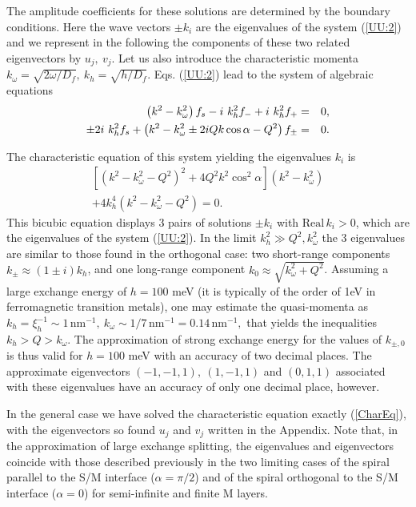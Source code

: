\documentclass[prb,amsmath,amssymb,reprint]{revtex4-2}
\begin{document}
The amplitude coefficients for these solutions are determined by the boundary
conditions. Here the wave vectors $ \pm k_{i}$ are the eigenvalues of the system (\ref{UU:2}) and we represent in the following the components of these two related eigenvectors by $u_{j},~v_{j}$. Let us also introduce the characteristic momenta $k_{\omega }= \sqrt{2\omega /D_{f}},~k_{h}=\sqrt{h/D_{f}}$.
Eqs. (\ref{UU:2}) lead to the system of algebraic equations
\begin{eqnarray}
\left( k^{2}-k_{\omega }^{2}\right) f_{s}-i\ k_{h}^{2}f_{-}+i\
k_{h}^{2}f_{+} &=&0,  \notag \\
 \pm 2i\ k_{h}^{2}f_{s}+\left( k^{2}-k_{\omega }^{2} \pm 2iQk\cos \alpha
-Q^{2}\right) f_{\pm} &=&0.  \label{kEq}
\end{eqnarray}

The characteristic equation of this system yielding the eigenvalues $k_{i}$ is
\begin{eqnarray}
\left[ (k^{2}-k_{\omega }^{2}-Q^{2})^{2}+4Q^{2}k^{2}\cos ^{2}\alpha \right]
\left( k^{2}-k_{\omega }^{2}\right) \nonumber \\ +4k_{h}^{4}(k^{2}-k_{\omega }^{2}-Q^{2})=0.
\label{CharEq}
\end{eqnarray}
This bicubic equation displays 3 pairs of solutions $\pm k_{i}$ with $\mathrm{Real} \, k_i>0$, which are the eigenvalues of the system (\ref{UU:2}). In the limit $k_{h}^{2}\gg Q^{2},k_{\omega }^{2}$ the 3 eigenvalues are similar to those found in the
orthogonal case: two short-range components $k_{\pm }\approx\left( 1\pm i\right) k_h$, and one long-range component $k_{0}\approx\sqrt{k_{\omega }^{2}+Q^{2}} $.
Assuming a large exchange energy of $h=100$ meV (it is typically of the order of 1eV in ferromagnetic transition metals),
 one may  estimate the
quasi-momenta  as \cite{Pugach2017} $k_{h}=\xi _{h}^{-1}\sim
1 \, $nm$^{-1},~k_{\omega }\sim 1/7 \, $nm$^{-1}=0.14 \,$nm$^{-1},$ that yields the inequalities $%
k_{h}>Q>k_{\omega }$. The approximation of strong exchange energy for the
values of $k_{\pm ,0}$ is thus valid for $h=100$ meV with an accuracy of two decimal places. The approximate eigenvectors $(-1,-1,1),~(1,-1,1)$ and $(0,1,1)$ associated with these eigenvalues have an accuracy of only one decimal place, however.


In the general case we have solved the  characteristic equation exactly  (\ref{CharEq}), with the eigenvectors so found $u_{j}$ and $v_{j}$ written in the Appendix. Note that, in the approximation of large exchange splitting, the eigenvalues and eigenvectors  coincide with those described previously in the two limiting cases of the spiral parallel to the S/M interface \cite{Champel2005,Champel08} ($\alpha=\pi/2$) and of the spiral orthogonal to the S/M interface ($\alpha=0$) for semi-infinite \cite{Pugach2017} and finite \cite{VolkovAnishchanka} M layers.
\end{document}
